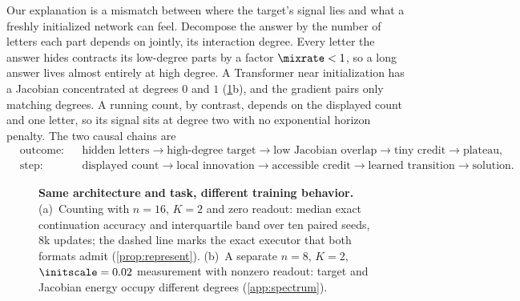 Our explanation is a mismatch between where the target's signal lies and what a freshly initialized network can feel.
Decompose the answer by the number of letters each part depends on jointly, its interaction degree. Every letter the
answer hides contracts its low-degree parts by a factor $\mixrate<1$, so a long answer lives almost entirely at high
degree. A Transformer near initialization has a Jacobian concentrated at degrees $0$ and $1$ (\cref{fig:overview}b), and
the gradient pairs only matching degrees. A running count, by contrast, depends on the displayed count and one letter, so
its signal sits at degree two with no exponential horizon penalty. The two causal chains are
\[
\begin{aligned}
 &\text{outcome:}&&\text{hidden letters}\to\text{high-degree target}\to\text{low Jacobian overlap}\to\text{tiny credit}\to\text{plateau},\\
 &\text{step:}&&\text{displayed count}\to\text{local innovation}\to\text{accessible credit}\to\text{learned transition}\to\text{solution}.
\end{aligned}
\]

\begin{figure}[t]
\centering

\caption{\textbf{Same architecture and task, different training behavior.}
(a)~Counting with $n=16$, $K=2$ and zero readout: median exact continuation accuracy and interquartile band over ten paired seeds, $8$k
updates; the dashed line marks the exact executor that both formats admit (\cref{prop:represent}).
(b)~A separate $n=8$, $K=2$, $\initscale=0.02$ measurement with nonzero readout: target and Jacobian energy occupy different degrees (\cref{app:spectrum}).}
\label{fig:overview}
\end{figure}

